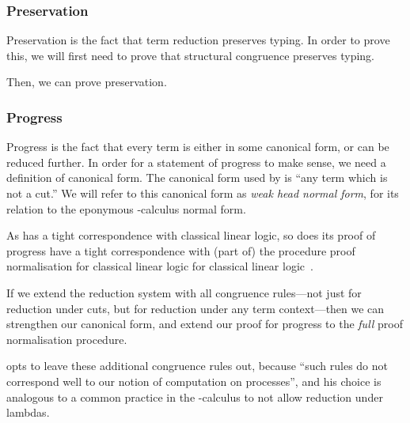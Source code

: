 \subsubsection{Preservation}
Preservation is the fact that term reduction preserves typing. In order to prove
this, we will first need to prove that structural congruence preserves typing.


Then, we can prove preservation.




\subsubsection{Progress}
Progress is the fact that every term is either in some canonical form, or can be
reduced further. In order for a statement of progress to make sense, we need a
definition of canonical form. The canonical form used by \cp is ``any term which
is not a cut.'' We will refer to this canonical form as \emph{weak head normal
form}, for its relation to the eponymous \textlambda-calculus normal form. 

As \cp has a tight correspondence with classical linear logic, so does its proof
of progress have a tight correspondence with (part of) the procedure proof
normalisation for classical linear logic for classical linear
logic~\cite{girard1987}.

If we extend the reduction system with all congruence rules---not just
\cpRedGammaCut for reduction under cuts, but for reduction under any term
context---then we can strengthen our canonical form, and extend our proof for
progress to the \emph{full} proof normalisation procedure.


 opts to leave these additional congruence rules out,
because ``such rules do not correspond well to our notion of computation on
processes'', and his choice is analogous to a common practice in the
\textlambda-calculus to not allow reduction under lambdas.


